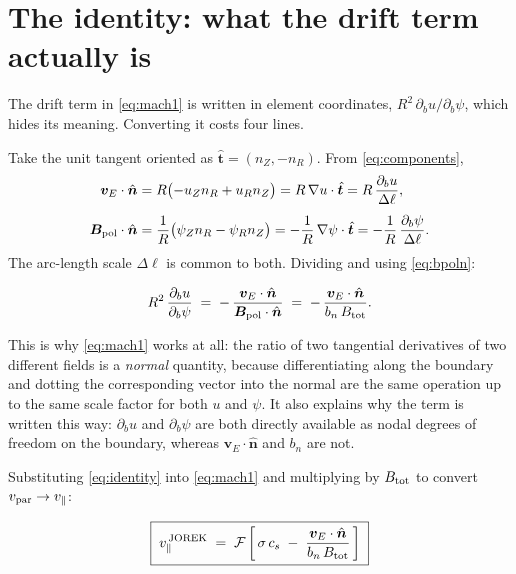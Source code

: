 \documentclass[11pt,a4paper]{article}
\newcommand{\nhat}{\hat{\bm{n}}}
\newcommand{\that}{\hat{\bm{t}}}
\newcommand{\vE}{\bm{v}_E}
\begin{document}
\section{The identity: what the drift term actually is}
\label{sec:identity}

The drift term in \eqref{eq:mach1} is written in element coordinates,
$R^2\,\partial_b u/\partial_b\psi$, which hides its meaning.  Converting it costs four lines.

Take the unit tangent oriented as $\that = (n_Z, -n_R)$.  From \eqref{eq:components},
\begin{align}
  \vE\cdot\nhat
    &= R\bigl(-u_Z n_R + u_R n_Z\bigr)
     = R\,\nabla u\cdot\that
     = R\,\frac{\partial_b u}{\Delta\ell},
     \label{eq:vEn}\\[4pt]
  \bm{B}_{\rm pol}\cdot\nhat
    &= \frac{1}{R}\bigl(\psi_Z n_R - \psi_R n_Z\bigr)
     = -\frac{1}{R}\,\nabla\psi\cdot\that
     = -\frac{1}{R}\,\frac{\partial_b\psi}{\Delta\ell}.
     \label{eq:Bn}
\end{align}
The arc-length scale $\Delta\ell$ is common to both.  Dividing and using \eqref{eq:bpoln}:

\begin{keybox}
\begin{equation}
  R^{2}\,\frac{\partial_b u}{\partial_b \psi}
  \;=\; -\,\frac{\vE\cdot\nhat}{\bm{B}_{\rm pol}\cdot\nhat}
  \;=\; -\,\frac{\vE\cdot\nhat}{b_n\,B_{\rm tot}} .
  \label{eq:identity}
\end{equation}
\end{keybox}

\noindent This is why \eqref{eq:mach1} works at all: the ratio of two tangential derivatives
of two different fields is a \emph{normal} quantity, because differentiating along the
boundary and dotting the corresponding vector into the normal are the same operation up to the
same scale factor for both $u$ and $\psi$.  It also explains why the term is written this way:
$\partial_b u$ and $\partial_b\psi$ are both directly available as nodal degrees of freedom on
the boundary, whereas $\vE\cdot\nhat$ and $b_n$ are not.

Substituting \eqref{eq:identity} into \eqref{eq:mach1} and multiplying by $B_{\rm tot}$ to
convert $v_{\rm par}\to v_\parallel$:

\begin{keybox}
\begin{equation}
  \boxed{\;
  v_\parallel^{\,\rm JOREK}
  \;=\; \mathcal{F}\left[\,\sigma\,c_s \;-\; \frac{\vE\cdot\nhat}{b_n\,B_{\rm tot}}\,\right]
  \;}
  \label{eq:jorekvpar}
\end{equation}
\end{keybox}
\end{document}
